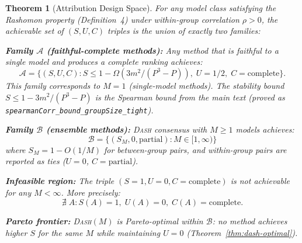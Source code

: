 \documentclass{article}
\newcommand{\DASH}{\textsc{Dash}}
\newtheorem{theorem}{Theorem}
\begin{document}
\begin{theorem}[Attribution Design Space]
\label{thm:design-space}
For any model class satisfying the Rashomon property (Definition~4)
under within-group correlation $\rho > 0$, the achievable set of
$(S, U, C)$ triples is the union of exactly two families:

\textbf{Family $\mathcal{A}$ (faithful-complete methods):}
Any method that is faithful to a single model and produces a
complete ranking achieves:
\begin{equation}
\label{eq:family-a}
    \mathcal{A} = \big\{(S, U, C) :
    S \leq 1 - \Omega(3m^2/(P^3{-}P)),\;
    U = 1/2,\;
    C = \text{complete}\big\}.
\end{equation}
This family corresponds to $M = 1$ (single-model methods).
The stability bound $S \leq 1 - 3m^2/(P^3{-}P)$ is the Spearman bound
from the main text (proved as \texttt{spearmanCorr\_bound\_groupSize\_tight}).

\textbf{Family $\mathcal{B}$ (ensemble methods):}
\DASH{} consensus with $M \geq 1$ models achieves:
\begin{equation}
\label{eq:family-b}
    \mathcal{B} = \big\{(S_M, 0, \text{partial}) : M \in [1, \infty)\big\}
\end{equation}
where $S_M = 1 - O(1/M)$ for between-group pairs, and within-group
pairs are reported as ties ($U = 0$, $C = \text{partial}$).

\textbf{Infeasible region:}
The triple $(S = 1, U = 0, C = \text{complete})$ is not achievable
for any $M < \infty$. More precisely:
\begin{equation}
\label{eq:infeasible}
    \nexists\; A : S(A) = 1,\; U(A) = 0,\; C(A) = \text{complete}.
\end{equation}

\textbf{Pareto frontier:}
\DASH{}$(M)$ is Pareto-optimal within $\mathcal{B}$: no method achieves
higher $S$ for the same $M$ while maintaining $U = 0$
(Theorem~\ref{thm:dash-optimal}).
\end{theorem}
\end{document}
